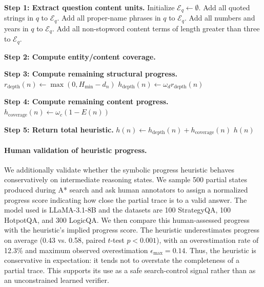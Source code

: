 \documentclass[11pt]{article}
\begin{document}
\begin{algorithm}[t]
\caption{Dataset-Agnostic Symbolic Progress Heuristic}
\label{alg:symbolic-progress-heuristic}

\BlankLine
\textbf{Step 1: Extract question content units.}\;
Initialize \(\mathcal{E}_q \leftarrow \emptyset\).\;
Add all quoted strings in \(q\) to \(\mathcal{E}_q\).\;
Add all proper-name phrases in \(q\) to \(\mathcal{E}_q\).\;
Add all numbers and years in \(q\) to \(\mathcal{E}_q\).\;
Add all non-stopword content terms of length greater than three to \(\mathcal{E}_q\).\;

\BlankLine
\textbf{Step 2: Compute entity/content coverage.}\;

\BlankLine
\textbf{Step 3: Compute remaining structural progress.}\;
\(r_{\mathrm{depth}}(n) \leftarrow \max(0,H_{\min}-d_n)\)\;
\(h_{\mathrm{depth}}(n) \leftarrow \omega_d r_{\mathrm{depth}}(n)\)\;

\BlankLine
\textbf{Step 4: Compute remaining content progress.}\;
\(h_{\mathrm{coverage}}(n) \leftarrow \omega_c(1-E(n))\)\;

\BlankLine
\textbf{Step 5: Return total heuristic.}\;
\(h(n) \leftarrow h_{\mathrm{depth}}(n)+h_{\mathrm{coverage}}(n)\)\;
\Return \(h(n)\)\;
\end{algorithm}

\paragraph{Human validation of heuristic progress.}
We additionally validate whether the symbolic progress heuristic behaves
conservatively on intermediate reasoning states. We sample 500 partial
states produced during A* search and ask human annotators to assign a
normalized progress score indicating how close the partial trace is to a
valid answer. The model used is LLaMA-3.1-8B and the datasets are 100 StrategyQA, 100 HotpotQA, and 300 LogicQA. We then compare this human-assessed progress with the
heuristic's implied progress score. The heuristic underestimates progress
on average (0.43 vs. 0.58, paired \(t\)-test \(p<0.001\)), with an
overestimation rate of 12.3\% and maximum observed overestimation
\(\epsilon_{\max}=0.14\). Thus, the heuristic is conservative in
expectation: it tends not to overstate the completeness of a partial
trace. This supports its use as a safe search-control signal rather than
as an unconstrained learned verifier.
\end{document}
